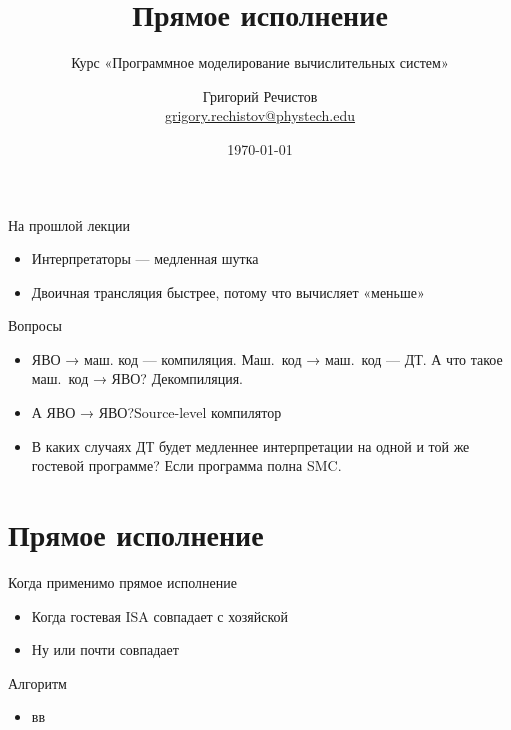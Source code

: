 \documentclass{beamer}
\title{Прямое исполнение}
\subtitle{Курс «Программное моделирование вычислительных систем»}
\author[]{Григорий Речистов \\ \small{\href{mailto:grigory.rechistov@phystech.edu}{grigory.rechistov@phystech.edu}}}
\date{\today}
\begin{document}
\begin{frame}
    \maketitle
\end{frame}

\begin{frame}
    \tableofcontents
\end{frame}


\begin{frame}{На прошлой лекции}
\begin{itemize}
\item Интерпретаторы — медленная шутка
\item Двоичная трансляция быстрее, потому что вычисляет «меньше»
\end{itemize}
\end{frame}

\begin{frame}{Вопросы}
\begin{itemize}
\item ЯВО → маш. код — компиляция. Маш.~код → маш.~код — ДТ. А что такое маш.~код → ЯВО?\pause{} Декомпиляция.\pause
\item А ЯВО → ЯВО?\pause Source-level компилятор\pause
\item В каких случаях ДТ будет медленнее интерпретации на одной и той же гостевой программе? \pause Если программа полна SMC.
\end{itemize}

\end{frame}


\section{Прямое исполнение}

\begin{frame}{Когда применимо прямое исполнение}
\begin{itemize}
\item Когда гостевая ISA совпадает с хозяйской
\item Ну или почти совпадает
\end{itemize}

\end{frame}


\begin{frame}{Алгоритм}
\begin{itemize}

\item вв
\end{itemize}
\end{frame}
\end{document}

